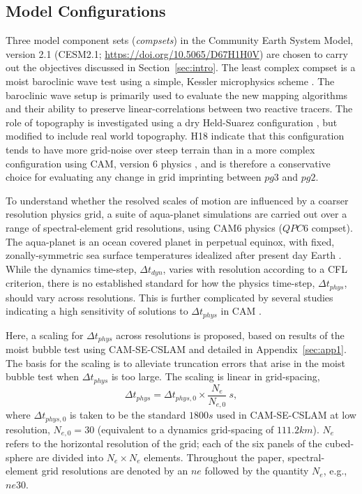 \documentclass{agujournal}
\begin{document}


\subsection{Model Configurations}\label{sec:config}

Three model component sets ({\em{compsets}}) in the Community Earth System Model, version 2.1 (CESM2.1; \url{https://doi.org/10.5065/D67H1H0V}) are chosen to carry out the objectives discussed in Section~\ref{sec:intro}. The least complex compset is a moist baroclinic wave test using a simple, Kessler microphysics scheme \citep[$FKESSLER$ compset;][]{LetAl2018JAMES}. The baroclinic wave setup is primarily used to evaluate the new mapping algorithms and their ability to preserve linear-correlations between two reactive tracers. The role of topography is investigated using a dry Held-Suarez configuration \citep[$FHS94$ compset;][]{HS1994}, but modified to include real world topography. H18 indicate that this configuration tends to have more grid-noise over steep terrain than in a more complex configuration using CAM, version 6 physics \citep[CAM6;][]{}, and is therefore a conservative choice for evaluating any change in grid imprinting between $pg3$ and $pg2$. 

To understand whether the resolved scales of motion are influenced by a coarser resolution physics grid, a suite of aqua-planet simulations \citep{NH2000ASL,MWO2016JAMES} are carried out over a range of spectral-element grid resolutions, using CAM6 physics ($QPC6$ compset). The aqua-planet is an ocean covered planet in perpetual equinox, with fixed, zonally-symmetric sea surface temperatures idealized after present day Earth \citep[$QOBS$ in][]{NH2000ASL}. While the dynamics time-step, $\Delta t_{dyn}$, varies with resolution according to a CFL criterion, there is no established standard for how the physics time-step, $\Delta t_{phys}$, should vary across resolutions. This is further complicated by several studies indicating a high sensitivity of solutions to $\Delta t_{phys}$ in CAM  \citep{WO2003QJR,W2013QJRMS,WETAL2015JAMES,HR2018JAMES}.

Here, a scaling for $\Delta t_{phys}$ across resolutions is proposed, based on results of the moist bubble test \citep{HR2018JAMES} using CAM-SE-CSLAM and detailed in Appendix~\ref{sec:app1}. The basis for the scaling is to alleviate truncation errors that arise in the moist bubble test when $\Delta t_{phys}$ is too large. The scaling is linear in grid-spacing,
\begin{equation}
\Delta t_{phys} = \Delta t_{phys,0} \times \frac{N_e}{N_{e,0}}~s,\label{eq:dt-scale}
\end{equation}
where $\Delta t_{phys,0}$ is taken to be the standard $1800 s$ used in CAM-SE-CSLAM at low resolution, $N_{e,0} = 30$ (equivalent to a dynamics grid-spacing of $111.2km$). $N_e$ refers to the horizontal resolution of the grid; each of the six panels of the cubed-sphere are divided into $N_e \times N_e$ elements. Throughout the paper, spectral-element grid resolutions are denoted by an $ne$ followed by the quantity $N_e$, e.g., $ne30$.
\end{document}
